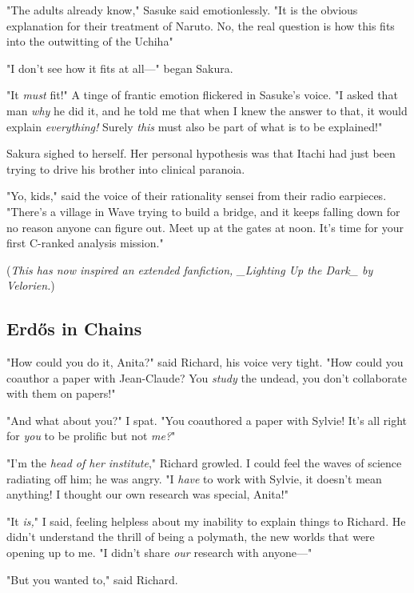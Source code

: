 "The adults already know," Sasuke said emotionlessly. "It is the obvious
explanation for their treatment of Naruto. No, the real question is how this
fits into the outwitting of the Uchiha{\el}"

"I don't see how it fits at all---" began Sakura.

"It \emph{must} fit!" A tinge of frantic emotion flickered in Sasuke's voice.
"I asked that man \emph{why} he did it, and he told me that when I knew the
answer to that, it would explain \emph{everything!} Surely \emph{this} must
also be part of what is to be explained!"

Sakura sighed to herself. Her personal hypothesis was that Itachi had just been
trying to drive his brother into clinical paranoia.

"Yo, kids," said the voice of their rationality sensei from their radio
earpieces. "There's a village in Wave trying to build a bridge, and it keeps
falling down for no reason anyone can figure out. Meet up at the gates at noon.
It's time for your first C-ranked analysis mission."

(\emph{This has now inspired an extended fanfiction, \_Lighting Up the Dark\_ by
Velorien.})
\sbreak%

\subsection{Erdős in Chains}

\noindent{}"How could you do it, Anita?" said Richard, his voice very tight. "How could
you coauthor a paper with Jean-Claude? You \emph{study} the undead, you don't
collaborate with them on papers!"

"And what about you?" I spat. "You coauthored a paper with Sylvie! It's all
right for \emph{you} to be prolific but not \emph{me?}"

"I'm the \emph{head of her institute}," Richard growled. I could feel the waves
of science radiating off him; he was angry. "I \emph{have} to work with Sylvie,
it doesn't mean anything! I thought our own research was special, Anita!"

"It \emph{is,}" I said, feeling helpless about my inability to explain things
to Richard. He didn't understand the thrill of being a polymath, the new worlds
that were opening up to me. "I didn't share \emph{our} research with anyone---"

"But you wanted to," said Richard.

